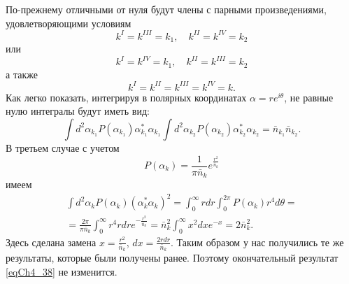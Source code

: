 По-прежнему отличными от нуля будут члены с парными произведениями,
удовлетворяющими условиям
\[
k^{I} = k^{III} = k_1, \quad k^{II} = k^{IV} = k_2
\]
или
\[
k^{I} = k^{IV} = k_1, \quad k^{II} = k^{III} = k_2
\]
а также
\[
k^{I} = k^{II} =  k^{III} = k^{IV} = k.
\]   
Как легко показать, интегрируя в полярных координатах $\alpha = r
e^{i\theta}$, не равные нулю интегралы будут иметь вид:
\begin{equation}
\int d^2 \alpha_{k_1} P\left(\alpha_{k_1}\right)
\alpha_{k_1}^{*} \alpha_{k_1}
\int d^2 \alpha_{k_2} P\left(\alpha_{k_2}\right)
\alpha_{k_2}^{*} \alpha_{k_2} = 
\bar{n}_{k_1} \bar{n}_{k_2}.
\nonumber
\end{equation}
В третьем случае с учетом 
\[
P\left(\alpha_k\right) = \frac{1}{\pi \bar{n}_k}e^{\frac{r^2}{\bar{n}_k}}
\]
имеем
\begin{eqnarray}
\int d^2\alpha_k P\left(\alpha_k\right)
\left(\alpha_k^{*}\alpha_k\right)^2 = 
\int_0^{\infty}r dr \int_0^{2\pi}P\left(\alpha_k\right) r^4 d \theta = 
\nonumber \\
= \frac{2 \pi}{\pi \bar{n}_k}\int_0^{\infty} r^4 r dr e^{-
  \frac{r^2}{\bar{n}_k}} = 
\bar{n}_k^2 \int_0^{\infty}x^2 d x e^{-x} = 2 \bar{n}_k^2.
\nonumber
\end{eqnarray}
Здесь сделана замена $x = \frac{r^2}{\bar{n}_k}$, $dx = \frac{2 r
  dr}{\bar{n}_k}$.
Таким образом у нас получились те же результаты, которые были получены
ранее. Поэтому окончательный результат \eqref{eqCh4_38} не изменится.

